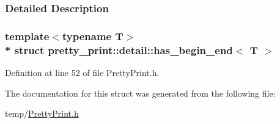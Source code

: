 \subsubsection{Detailed Description}
\subsubsection*{template$<$typename T$>$\\*
struct pretty\+\_\+print\+::detail\+::has\+\_\+begin\+\_\+end$<$ T $>$}



Definition at line 52 of file Pretty\+Print.\+h.



The documentation for this struct was generated from the following file\+:\begin{DoxyCompactItemize}
\item 
temp/\hyperlink{PrettyPrint_8h}{Pretty\+Print.\+h}\end{DoxyCompactItemize}
